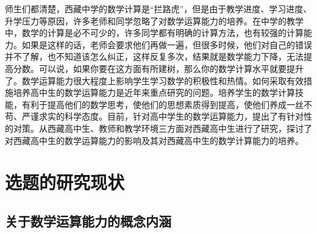 
师生们都清楚，西藏中学的数学计算是“拦路虎”，但是由于教学进度、学习进度、升学压力等原因，许多老师和同学忽略了对数学运算能力的培养\cite{董安妮关于西藏高中生数学运算能力现状研究}。在中学的教学中，数学的计算是必不可少的，许多同学都有明确的计算方法，也有较强的计算能力。如果是这样的话，老师会要求他们再做一遍，但很多时候，他们对自己的错误并不了解，也不知道该怎么纠正，这样反复多次，结果就是数学能力下降，无法提高分数。可以说，如果你要在这方面有所建树，那么你的数学计算水平就要提升了。数学运算能力很大程度上影响学生学习数学的积极性和热情\cite{康恬雨西藏高中生数学运算能力的发展现状与培养策略研究}。如何采取有效措施培养高中生的数学运算能力是近年来重点研究的问题。培养学生的数学计算技能，有利于提高他们的数学思考，使他们的思想素质得到提高，使他们养成一丝不苟、严谨求实的科学态度\cite{龙奕羽素质教育视野中高数教学与课程思政的融合}。目前，针对高中学生的数学运算能力，提出了有针对性的对策。从西藏高中生、教师和教学环境三方面对西藏高中生进行了研究，探讨了对西藏高中生的数学运算能力的影响及其对西藏高中生的数学计算能力的培养。



\section{选题的研究现状}


\subsection{关于数学运算能力的概念内涵}



